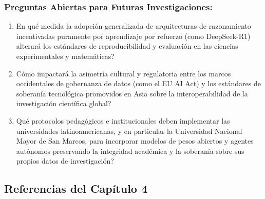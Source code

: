 \subsubsection*{Preguntas Abiertas para Futuras Investigaciones:}
\begin{enumerate}[label=\arabic*., leftmargin=2em]
    \item \textquestiondown En qué medida la adopción generalizada de arquitecturas de razonamiento incentivadas puramente por aprendizaje por refuerzo (como DeepSeek-R1) alterará los estándares de reproducibilidad y evaluación en las ciencias experimentales y matemáticas?
    \item \textquestiondown Cómo impactará la asimetría cultural y regulatoria entre los marcos occidentales de gobernanza de datos (como el EU AI Act) y los estándares de soberanía tecnológica promovidos en Asia sobre la interoperabilidad de la investigación científica global?
    \item \textquestiondown Qué protocolos pedagógicos e institucionales deben implementar las universidades latinoamericanas, y en particular la Universidad Nacional Mayor de San Marcos, para incorporar modelos de pesos abiertos y agentes autónomos preservando la integridad académica y la soberanía sobre sus propios datos de investigación?
\end{enumerate}

\newpage
{}

\subsection*{Referencias del Capítulo 4}

